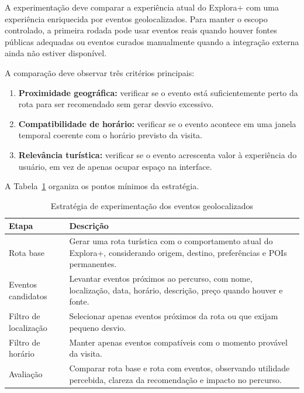 \documentclass[12pt, a4paper]{article}
\begin{document}
A experimenta\c{c}\~ao deve comparar a experi\^encia atual do Explora+ com uma experi\^encia enriquecida por eventos geolocalizados. Para manter o escopo controlado, a primeira rodada pode usar eventos reais quando houver fontes p\'ublicas adequadas ou eventos curados manualmente quando a integra\c{c}\~ao externa ainda n\~ao estiver dispon\'ivel.

A compara\c{c}\~ao deve observar tr\^es crit\'erios principais:

\begin{enumerate}
  \item \textbf{Proximidade geogr\'afica:} verificar se o evento est\'a suficientemente perto da rota para ser recomendado sem gerar desvio excessivo.
  \item \textbf{Compatibilidade de hor\'ario:} verificar se o evento acontece em uma janela temporal coerente com o hor\'ario previsto da visita.
  \item \textbf{Relev\^ancia tur\'istica:} verificar se o evento acrescenta valor \`a experi\^encia do usu\'ario, em vez de apenas ocupar espa\c{c}o na interface.
\end{enumerate}

A Tabela~\ref{tab:experimentacao} organiza os pontos m\'inimos da estrat\'egia.

\begin{table}[H]
\centering
\caption{Estrat\'egia de experimenta\c{c}\~ao dos eventos geolocalizados}
\label{tab:experimentacao}
\begin{tabular}{p{4.0cm}p{9.0cm}}
\toprule
\textbf{Etapa} & \textbf{Descri\c{c}\~ao} \\
\midrule
Rota base & Gerar uma rota tur\'istica com o comportamento atual do Explora+, considerando origem, destino, prefer\^encias e POIs permanentes. \\
Eventos candidatos & Levantar eventos pr\'oximos ao percurso, com nome, localiza\c{c}\~ao, data, hor\'ario, descri\c{c}\~ao, pre\c{c}o quando houver e fonte. \\
Filtro de localiza\c{c}\~ao & Selecionar apenas eventos pr\'oximos da rota ou que exijam pequeno desvio. \\
Filtro de hor\'ario & Manter apenas eventos compat\'iveis com o momento prov\'avel da visita. \\
Avalia\c{c}\~ao & Comparar rota base e rota com eventos, observando utilidade percebida, clareza da recomenda\c{c}\~ao e impacto no percurso. \\
\bottomrule
\end{tabular}
\end{table}
\end{document}
